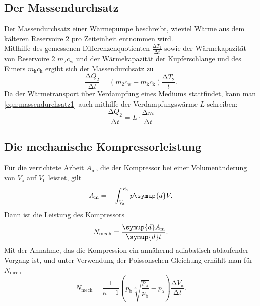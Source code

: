\documentclass{scrartcl} %
\begin{document}
	\subsection{Der Massendurchsatz}
	Der Massendurchsatz einer Wärmepumpe beschreibt, wieviel Wärme aus dem kälteren Reservoire 2 pro Zeiteinheit entnommen wird. \\
	Mitlhilfe des gemessenen Differenzenquotienten $ \frac{\increment T_\text{2}}{\increment t}$ sowie der Wärmekapazität von Reservoire 2
	$m_\text{2}c_\text{w}$ und der Wärmekapazität der Kupferschlange und des Eimers $m_\text{k}c_\text{k}$ ergibt sich der Massendurchsatz
	zu
	\begin{equation}
		\frac{\increment Q_\text{2}}{\increment t} = (m_\text{2} c_\text{w} + m_\text{k} c_\text{k}) \frac{\increment T_\text{2}}{t}.
		\label{eqn:massendurchsatz1}
	\end{equation}
	Da der Wärmetransport über Verdampfung eines Mediums stattfindet, kann man \eqref{eqn:massendurchsatz1} auch mithilfe der
	Verdampfungswärme $L$ schreiben:
	\begin{equation}
		\frac{\increment Q_\text{2}}{\increment t} = L \cdot \frac{\increment m}{\increment t}
		\label{eqn:massendurchsatz2}
	\end{equation}
  \subsection{Die mechanische Kompressorleistung}
  Für die verrichtete Arbeit $A_\text{m}$, die der Kompressor bei einer Volumenänderung von $V_\text{a}$ auf $V_\text{b}$ leistet, gilt
  \begin{equation}
    A_\text{m} = -\int_{V_\text{a}}^{V_\text{b}} p \symup{d}V.
  \label{eqn:arbeitkompressor}
  \end{equation}
  Dann ist die Leistung des Kompressors
  \begin{equation}
    N_\text{mech} = \frac{\symup{d} A_\text{m}}{\symup{d} t}.
    \label{eqn:leistungkompressor1}
  \end{equation}
  Mit der Annahme, das die Kompression ein annähernd adiabatisch ablaufender Vorgang ist, und unter Verwendung der Poissonschen Gleichung erhählt man für $N_\text{mech}$
  \begin{equation}
    N_\text{mech} = \frac{1}{\kappa - 1}  \left(p_\text{b} \sqrt[\kappa]{\frac{p_\text{a}}{p_\text{b}}} - p_\text{a} \right)  \frac{\increment V_\text{a}}{\increment t}.
    \label{eqn:leistungkompressor2}
  \end{equation}
\end{document}
